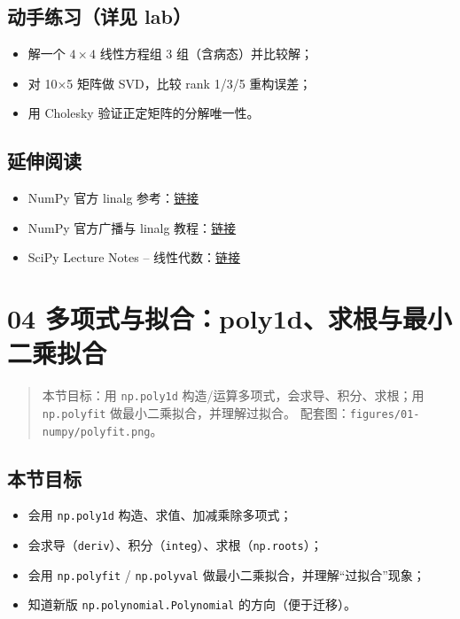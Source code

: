 \subsection{动手练习（详见
lab）}\label{ux52a8ux624bux7ec3ux4e60ux8be6ux89c1-lab-2}

\begin{itemize}
\tightlist
\item
  解一个 \(4\times4\) 线性方程组 3 组（含病态）并比较解；
\item
  对 10×5 矩阵做 SVD，比较 rank 1/3/5 重构误差；
\item
  用 Cholesky 验证正定矩阵的分解唯一性。
\end{itemize}

\subsection{延伸阅读}\label{ux5ef6ux4f38ux9605ux8bfb-2}

\begin{itemize}
\tightlist
\item
  NumPy 官方 linalg
  参考：\href{https://numpy.org/doc/stable/reference/routines.linalg.html}{链接}
\item
  NumPy 官方广播与 linalg
  教程：\href{https://numpy.org/doc/stable/reference/routines.linalg.html\#module-numpy.linalg}{链接}
\item
  SciPy Lecture Notes --
  线性代数：\href{https://scipy-lectures.org/intro/scipy.html\#linear-algebra}{链接}
\end{itemize}

\section{04
多项式与拟合：poly1d、求根与最小二乘拟合}\label{ux591aux9879ux5f0fux4e0eux62dfux5408poly1dux6c42ux6839ux4e0eux6700ux5c0fux4e8cux4e58ux62dfux5408}

\begin{quote}
本节目标：用 \texttt{np.poly1d} 构造/运算多项式，会求导、积分、求根；用
\texttt{np.polyfit} 做最小二乘拟合，并理解过拟合。
配套图：\texttt{figures/01-numpy/polyfit.png}。
\end{quote}

\subsection{本节目标}\label{ux672cux8282ux76eeux6807-10}

\begin{itemize}
\tightlist
\item
  会用 \texttt{np.poly1d} 构造、求值、加减乘除多项式；
\item
  会求导（\texttt{deriv}）、积分（\texttt{integ}）、求根（\texttt{np.roots}）；
\item
  会用 \texttt{np.polyfit} / \texttt{np.polyval}
  做最小二乘拟合，并理解``过拟合''现象；
\item
  知道新版 \texttt{np.polynomial.Polynomial} 的方向（便于迁移）。
\end{itemize}


